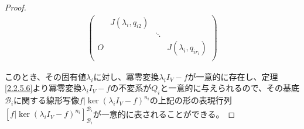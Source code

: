 \documentclass[dvipdfmx]{jsarticle}
\begin{document}
\begin{proof}
\begin{align*}
\begin{pmatrix}
\  & J\left( \lambda_{i},q_{i2} \right) & \  & \  \\
\  & \  & \ddots & \  \\
O & \  & \  & J\left( \lambda_{i},q_{ir_{i}} \right) \\
\end{pmatrix}
\end{align*}\par
このとき、その固有値$\lambda_{i}$に対し、冪零変換$\lambda_{i}I_{V} - f$が一意的に存在し、定理\ref{2.2.5.6}より冪零変換$\lambda_{i}I_{V} - f$の不変系が$Q_{i}$と一意的に与えられるので、その基底$\mathcal{B}_{i}$に関する線形写像$f|\ker\left( \lambda_{i}I_{V} - f \right)^{n_{i}}$の上記の形の表現行列$\left[ f|\ker\left( \lambda_{i}I_{V} - f \right)^{n_{i}} \right]_{\mathcal{B}_{i}}^{\mathcal{B}_{i}}$が一意的に表されることができる。
\end{proof}
\end{document}
